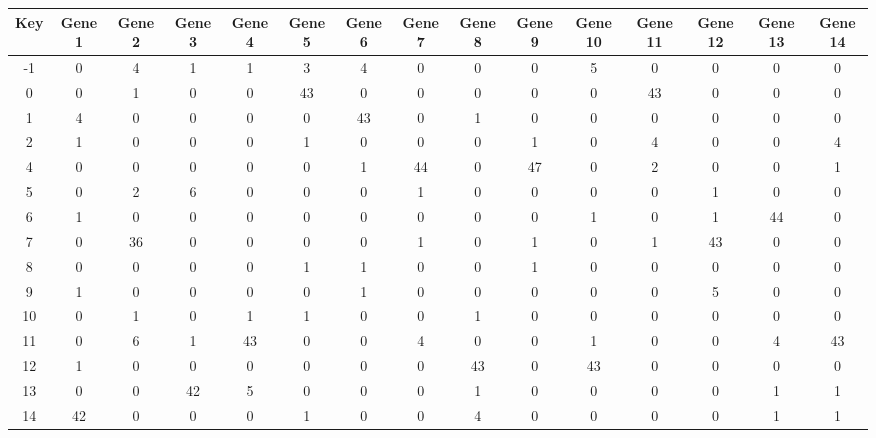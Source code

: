 \begin{tabular}{|c|c|c|c|c|c|c|c|c|c|c|c|c|c|c|}
\hline
Key & Gene 1 & Gene 2 & Gene 3 & Gene 4 & Gene 5 & Gene 6 & Gene 7 & Gene 8 & Gene 9 & Gene 10 & Gene 11 & Gene 12 & Gene 13 & Gene 14 \\
\hline
-1 & 0 & 4 & 1 & 1 & 3 & 4 & 0 & 0 & 0 & 5 & 0 & 0 & 0 & 0 \\
0 & 0 & 1 & 0 & 0 & 43 & 0 & 0 & 0 & 0 & 0 & 43 & 0 & 0 & 0 \\
1 & 4 & 0 & 0 & 0 & 0 & 43 & 0 & 1 & 0 & 0 & 0 & 0 & 0 & 0 \\
2 & 1 & 0 & 0 & 0 & 1 & 0 & 0 & 0 & 1 & 0 & 4 & 0 & 0 & 4 \\
4 & 0 & 0 & 0 & 0 & 0 & 1 & 44 & 0 & 47 & 0 & 2 & 0 & 0 & 1 \\
5 & 0 & 2 & 6 & 0 & 0 & 0 & 1 & 0 & 0 & 0 & 0 & 1 & 0 & 0 \\
6 & 1 & 0 & 0 & 0 & 0 & 0 & 0 & 0 & 0 & 1 & 0 & 1 & 44 & 0 \\
7 & 0 & 36 & 0 & 0 & 0 & 0 & 1 & 0 & 1 & 0 & 1 & 43 & 0 & 0 \\
8 & 0 & 0 & 0 & 0 & 1 & 1 & 0 & 0 & 1 & 0 & 0 & 0 & 0 & 0 \\
9 & 1 & 0 & 0 & 0 & 0 & 1 & 0 & 0 & 0 & 0 & 0 & 5 & 0 & 0 \\
10 & 0 & 1 & 0 & 1 & 1 & 0 & 0 & 1 & 0 & 0 & 0 & 0 & 0 & 0 \\
11 & 0 & 6 & 1 & 43 & 0 & 0 & 4 & 0 & 0 & 1 & 0 & 0 & 4 & 43 \\
12 & 1 & 0 & 0 & 0 & 0 & 0 & 0 & 43 & 0 & 43 & 0 & 0 & 0 & 0 \\
13 & 0 & 0 & 42 & 5 & 0 & 0 & 0 & 1 & 0 & 0 & 0 & 0 & 1 & 1 \\
14 & 42 & 0 & 0 & 0 & 1 & 0 & 0 & 4 & 0 & 0 & 0 & 0 & 1 & 1 \\
\hline
\end{tabular}